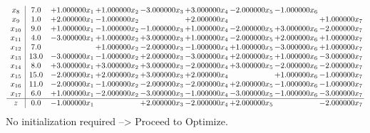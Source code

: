 \documentclass[10pt]{article}
\begin{document}
\[\begin{array}{c| c c@{\hskip 2pt} c@{\hskip 2pt} c@{\hskip 2pt} c@{\hskip 2pt} c@{\hskip 2pt} c@{\hskip 2pt} c@{\hskip 2pt} }
 x_{8}   &  7.0 & + 1.000000 x_{1} & + 1.000000 x_{2} & -3.000000 x_{3} & + 3.000000 x_{4} & -2.000000 x_{5} & -1.000000 x_{6} &   \\
 x_{9}   &  1.0 & + 2.000000 x_{1} & -1.000000 x_{2} &   & + 2.000000 x_{4} &    &   & + 1.000000 x_{7}\\
 x_{10}   &  9.0 & + 1.000000 x_{1} & -1.000000 x_{2} & -1.000000 x_{3} & + 1.000000 x_{4} & -2.000000 x_{5} & + 3.000000 x_{6} & -2.000000 x_{7}\\
 x_{11}   &  4.0 & -3.000000 x_{1} & + 1.000000 x_{2} & + 3.000000 x_{3} & + 1.000000 x_{4} & -2.000000 x_{5} & + 2.000000 x_{6} & + 1.000000 x_{7}\\
 x_{12}   &  7.0  &   & + 1.000000 x_{2} & -2.000000 x_{3} & -1.000000 x_{4} & + 1.000000 x_{5} & -3.000000 x_{6} & + 1.000000 x_{7}\\
 x_{13}   &  13.0 & -3.000000 x_{1} & -1.000000 x_{2} & + 2.000000 x_{3} & -3.000000 x_{4} & + 2.000000 x_{5} & + 1.000000 x_{6} & -3.000000 x_{7}\\
 x_{14}   &  8.0 & + 3.000000 x_{1} & + 3.000000 x_{2} & + 3.000000 x_{3} & -2.000000 x_{4} & + 3.000000 x_{5} & -2.000000 x_{6} & -2.000000 x_{7}\\
 x_{15}   &  15.0 & -2.000000 x_{1} & + 2.000000 x_{2} & + 3.000000 x_{3} & + 2.000000 x_{4} &   & + 1.000000 x_{6} & -1.000000 x_{7}\\
 x_{16}   &  11.0 & -2.000000 x_{1} & -1.000000 x_{2} & -2.000000 x_{3} & -2.000000 x_{4} & + 2.000000 x_{5} & -1.000000 x_{6} & -1.000000 x_{7}\\
 x_{17}   &  6.0 & + 1.000000 x_{1} & -2.000000 x_{2} & -3.000000 x_{3} & -1.000000 x_{4} & -3.000000 x_{5} & -1.000000 x_{6} & -3.000000 x_{7}\\
\hline
z    &  0.0 & -1.000000 x_{1} &   & + 2.000000 x_{3} & -2.000000 x_{4} & + 2.000000 x_{5} &   & -2.000000 x_{7}\\
\end{array}\]
No initialization required --> Proceed to Optimize. 
\end{document}
